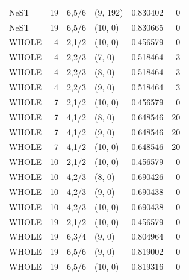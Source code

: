 \begin{longtable}{@{}lrrlrr@{}}
NeST & 19 & 6,5/6 & (9, 192) & 0.830402 & 0\\
NeST & 19 & 6,5/6 & (10, 0) & 0.830665 & 0\\
WHOLE & 4 & 2,1/2 & (10, 0) & 0.456579 & 0\\
WHOLE & 4 & 2,2/3 & (7, 0) & 0.518464 & 3\\
WHOLE & 4 & 2,2/3 & (8, 0) & 0.518464 & 3\\
WHOLE & 4 & 2,2/3 & (9, 0) & 0.518464 & 3\\
WHOLE & 7 & 2,1/2 & (10, 0) & 0.456579 & 0\\
WHOLE & 7 & 4,1/2 & (8, 0) & 0.648546 & 20\\
WHOLE & 7 & 4,1/2 & (9, 0) & 0.648546 & 20\\
WHOLE & 7 & 4,1/2 & (10, 0) & 0.648546 & 20\\
WHOLE & 10 & 2,1/2 & (10, 0) & 0.456579 & 0\\
WHOLE & 10 & 4,2/3 & (8, 0) & 0.690426 & 0\\
WHOLE & 10 & 4,2/3 & (9, 0) & 0.690438 & 0\\
WHOLE & 10 & 4,2/3 & (10, 0) & 0.690438 & 0\\
WHOLE & 19 & 2,1/2 & (10, 0) & 0.456579 & 0\\
WHOLE & 19 & 6,3/4 & (9, 0) & 0.804964 & 0\\
WHOLE & 19 & 6,5/6 & (9, 0) & 0.819002 & 0\\
WHOLE & 19 & 6,5/6 & (10, 0) & 0.819316 & 0\\
\bottomrule\end{longtable}
